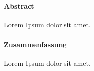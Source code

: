 \cleardoublepage
\thispagestyle{plain}

\makeatletter
\begin{center}
	\large\textbf{\@title}\\
	\normalsize\@author
\end{center}
\makeatother

\paragraph{Abstract}

Lorem Ipsum dolor sit amet.


\begin{otherlanguage}{ngerman}

\paragraph{Zusammenfassung}

Lorem Ipsum dolor sit amet.

\end{otherlanguage}
